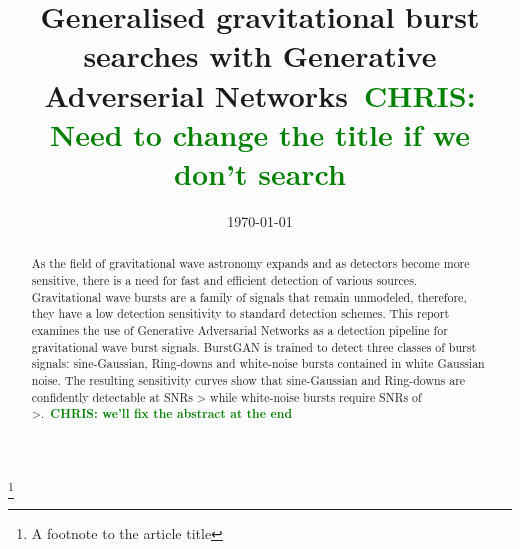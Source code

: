 \documentclass[%
 reprint,
 amsmath,amssymb,
 aps,
]{revtex4-2}
\newcommand{\chris}[1]{\textbf{\textcolor{green}{CHRIS: #1}}}
\begin{document}

\title{Generalised gravitational burst searches with Generative Adverserial
Networks~\chris{Need to change the title if we don't search}}%
\thanks{A footnote to the article title}%


 \email{}
%


\date{\today}%

\begin{abstract}
As the field of gravitational wave astronomy expands and as detectors become
more sensitive, there is a need for fast and efficient detection of various
sources. Gravitational wave bursts are a family of signals that remain
unmodeled, therefore, they have a low detection sensitivity to standard
detection schemes. This report examines the use of Generative Adversarial
Networks as a detection pipeline for gravitational wave burst signals. BurstGAN
is trained to detect three classes of burst signals: sine-Gaussian, Ring-downs
and white-noise bursts contained in white Gaussian noise. The resulting
sensitivity curves show that sine-Gaussian and Ring-downs are confidently
detectable at SNRs > while white-noise bursts require SNRs of >.~\chris{we'll
fix the abstract at the end}
\end{abstract}

\maketitle
\end{document}

